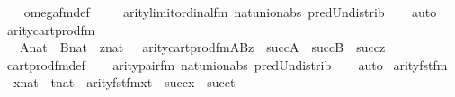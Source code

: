\begin{isabellebody}
%
\isadelimproof
\ \ %
\endisadelimproof
%
\isatagproof
{}\isamarkupfalse%
\ omega{\isacharunderscore}{\kern0pt}fm{\isacharunderscore}{\kern0pt}def\ \isanewline
\ \ \isamarkupfalse%
\ arity{\isacharunderscore}{\kern0pt}limit{\isacharunderscore}{\kern0pt}ordinal{\isacharunderscore}{\kern0pt}fm\ nat{\isacharunderscore}{\kern0pt}union{\isacharunderscore}{\kern0pt}abs{}\ pred{\isacharunderscore}{\kern0pt}Un{\isacharunderscore}{\kern0pt}distrib\isanewline
\ \ \isamarkupfalse%
\ auto%
\endisatagproof
{\isafoldproof}%
%
\isadelimproof
\isanewline
%
\endisadelimproof
\isanewline
{}\isamarkupfalse%
\ arity{\isacharunderscore}{\kern0pt}cartprod{\isacharunderscore}{\kern0pt}fm\ {\isacharcolon}{\kern0pt}\ \isanewline
\ \ {\isachardoublequoteopen}{\isasymlbrakk}\ A{\isasymin}nat\ {\isacharsemicolon}{\kern0pt}\ B{\isasymin}nat\ {\isacharsemicolon}{\kern0pt}\ z{\isasymin}nat\ {\isasymrbrakk}\ {\isasymLongrightarrow}\ arity{\isacharparenleft}{\kern0pt}cartprod{\isacharunderscore}{\kern0pt}fm{\isacharparenleft}{\kern0pt}A{\isacharcomma}{\kern0pt}B{\isacharcomma}{\kern0pt}z{\isacharparenright}{\kern0pt}{\isacharparenright}{\kern0pt}\ {\isacharequal}{\kern0pt}\ succ{\isacharparenleft}{\kern0pt}A{\isacharparenright}{\kern0pt}\ {\isasymunion}\ succ{\isacharparenleft}{\kern0pt}B{\isacharparenright}{\kern0pt}\ {\isasymunion}\ succ{\isacharparenleft}{\kern0pt}z{\isacharparenright}{\kern0pt}{\isachardoublequoteclose}\isanewline
%
\isadelimproof
\ \ %
\endisadelimproof
%
\isatagproof
{}\isamarkupfalse%
\ cartprod{\isacharunderscore}{\kern0pt}fm{\isacharunderscore}{\kern0pt}def\isanewline
\ \ \isamarkupfalse%
\ arity{\isacharunderscore}{\kern0pt}pair{\isacharunderscore}{\kern0pt}fm\ nat{\isacharunderscore}{\kern0pt}union{\isacharunderscore}{\kern0pt}abs{}\ pred{\isacharunderscore}{\kern0pt}Un{\isacharunderscore}{\kern0pt}distrib\isanewline
\ \ \isamarkupfalse%
\ auto%
\endisatagproof
{\isafoldproof}%
%
\isadelimproof
\isanewline
%
\endisadelimproof
\isanewline
{}\isamarkupfalse%
\ arity{\isacharunderscore}{\kern0pt}fst{\isacharunderscore}{\kern0pt}fm\ {\isacharcolon}{\kern0pt}\isanewline
\ \ {\isachardoublequoteopen}{\isasymlbrakk}x{\isasymin}nat\ {\isacharsemicolon}{\kern0pt}\ t{\isasymin}nat{\isasymrbrakk}\ {\isasymLongrightarrow}\ arity{\isacharparenleft}{\kern0pt}fst{\isacharunderscore}{\kern0pt}fm{\isacharparenleft}{\kern0pt}x{\isacharcomma}{\kern0pt}t{\isacharparenright}{\kern0pt}{\isacharparenright}{\kern0pt}\ {\isacharequal}{\kern0pt}\ succ{\isacharparenleft}{\kern0pt}x{\isacharparenright}{\kern0pt}\ {\isasymunion}\ succ{\isacharparenleft}{\kern0pt}t{\isacharparenright}{\kern0pt}{\isachardoublequoteclose}\isanewline

\end{isabellebody}
